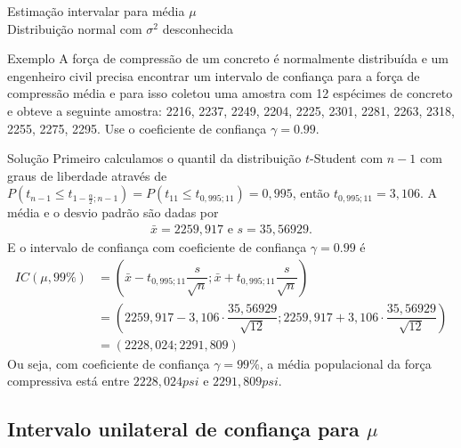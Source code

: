 \documentclass[8pt]{beamer}
\begin{document}
\begin{frame}{Estimação intervalar para média $\mu$\\ Distribuição normal com $\sigma^2$ desconhecida}

\small
	\begin{block}{Exemplo}
		A força de compressão de um concreto é normalmente distribuída e um engenheiro civil precisa encontrar um intervalo de confiança para a força de compressão média e para isso coletou uma amostra com 12 espécimes de concreto e obteve a seguinte amostra: 2216, 2237, 2249, 2204, 2225, 2301, 2281, 2263, 2318, 2255, 2275, 2295. Use o coeficiente de confiança $\gamma = 0.99$.
		
	\end{block}
	\vfill

	\begin{block}{Solução}
		Primeiro calculamos o quantil da distribuição $t$-Student com $n-1$ com graus de liberdade através de $P(t_{n-1} \leq t_{1-\frac{\alpha}{2};n-1} ) = P(t_{11} \leq t_{0,995;11}) = 0,995$, então $t_{0,995;11} = 3,106$. A média e o desvio padrão são dadas por
		\begin{align*}
			\bar{x} = 2259,917 \mbox{ e } s = 35,56929.
		\end{align*}
		E o intervalo de confiança com coeficiente de confiança $\gamma = 0.99$ é 
		\begin{align*}
			IC(\mu, 99\%) &= \left( \bar{x} - t_{0,995;11} \dfrac{s}{\sqrt{n}}; \bar{x} + t_{0,995;11} \dfrac{s}{\sqrt{n}}  \right)\\
			&= \left( 2259,917 - 3,106 \cdot \dfrac{35,56929}{\sqrt{12}}; 2259,917 + 3,106 \cdot \dfrac{35,56929}{\sqrt{12}} \right)\\
			&= (2228,024; 2291,809)
		\end{align*}
		Ou seja, com coeficiente de confiança $\gamma=99\%$, a média populacional da força compressiva está entre $2228,024psi$ e $2291,809psi$.
	\end{block}
\normalsize

\end{frame}

\subsection{Intervalo unilateral de confiança para $\mu$}
\end{document}
